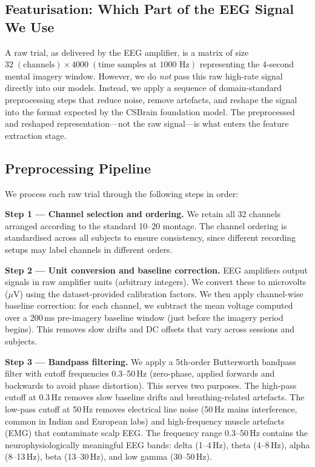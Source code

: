 \documentclass{article}
\begin{document}
\subsection{Featurisation: Which Part of the EEG Signal We Use}

A raw trial, as delivered by the EEG amplifier, is a matrix of size $32 \; (\text{channels}) \times 4000 \; (\text{time samples at 1000 Hz})$ representing the 4-second mental imagery window. However, we do \emph{not} pass this raw high-rate signal directly into our models. Instead, we apply a sequence of domain-standard preprocessing steps that reduce noise, remove artefacts, and reshape the signal into the format expected by the CSBrain foundation model. The preprocessed and reshaped representation---not the raw signal---is what enters the feature extraction stage.

\subsection{Preprocessing Pipeline}

We process each raw trial through the following steps in order:

\textbf{Step 1 --- Channel selection and ordering.} We retain all 32 channels arranged according to the standard 10--20 montage. The channel ordering is standardised across all subjects to ensure consistency, since different recording setups may label channels in different orders.

\textbf{Step 2 --- Unit conversion and baseline correction.} EEG amplifiers output signals in raw amplifier units (arbitrary integers). We convert these to microvolts ($\mu$V) using the dataset-provided calibration factors. We then apply channel-wise baseline correction: for each channel, we subtract the mean voltage computed over a 200\,ms pre-imagery baseline window (just before the imagery period begins). This removes slow drifts and DC offsets that vary across sessions and subjects.

\textbf{Step 3 --- Bandpass filtering.} We apply a 5th-order Butterworth bandpass filter with cutoff frequencies 0.3--50\,Hz (zero-phase, applied forwards and backwards to avoid phase distortion). This serves two purposes. The high-pass cutoff at 0.3\,Hz removes slow baseline drifts and breathing-related artefacts. The low-pass cutoff at 50\,Hz removes electrical line noise (50\,Hz mains interference, common in Indian and European labs) and high-frequency muscle artefacts (EMG) that contaminate scalp EEG. The frequency range 0.3--50\,Hz contains the neurophysiologically meaningful EEG bands: delta (1--4\,Hz), theta (4--8\,Hz), alpha (8--13\,Hz), beta (13--30\,Hz), and low gamma (30--50\,Hz).
\end{document}
